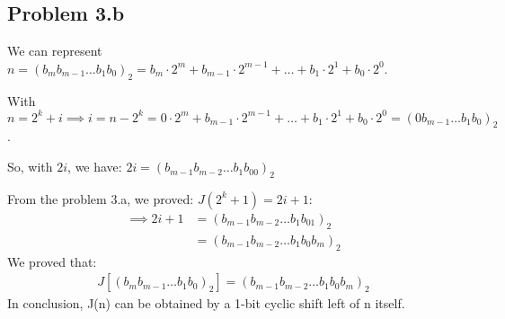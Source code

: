 \documentclass[a4paper]{article}
\begin{document}
\subsection{Problem 3.b}
We can represent $n = (b_mb_{m-1} \ldots b_1b_0)_2 = b_m \cdot 2^m + b_{m-1} \cdot2^{m-1} + \ldots + b_1 \cdot 2^1 + b_0 \cdot 2^0$. \par \bigskip
With $n=2^k+i \implies i = n-2^k = 0 \cdot 2^m + b_{m-1} \cdot2^{m-1} + \ldots + b_1 \cdot 2^1 + b_0 \cdot 2^0 = (0b_{m-1} \ldots b_1b_0)_2$.\par \bigskip
So, with $2i$, we have: $2i = (b_{m-1}b_{m-2} \ldots b_1b_00)_2$ \par \bigskip
From the problem 3.a, we proved: $J(2^k+1)=2i+1$:
\begin{equation*}
    \begin{aligned}
        \implies 2i+1& = (b_{m-1}b_{m-2} \ldots b_1b_01)_2 \\
        &= (b_{m-1}b_{m-2} \ldots b_1b_0b_m)_2
    \end{aligned}
\end{equation*}
We proved that: 
\begin{gather*}
    J[(b_mb_{m-1} \ldots b_1b_0)_2] = (b_{m-1}b_{m-2} \ldots b_1b_0b_m)_2
\end{gather*}
In conclusion, J(n) can be obtained by a 1-bit cyclic shift left of n itself.
\newpage
\end{document}
